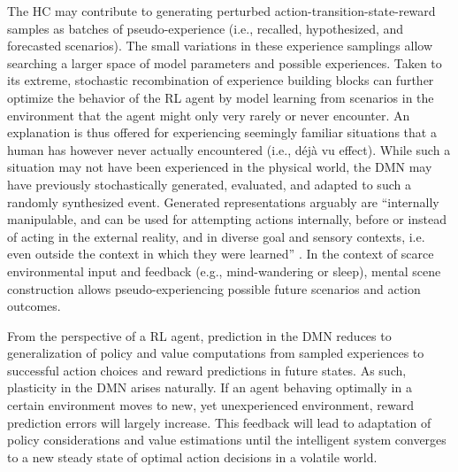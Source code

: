 \documentclass[10pt,letterpaper]{article}
\begin{document}
The HC may contribute to generating
perturbed action-transition-state-reward samples
as batches of pseudo-experience
(i.e., recalled, hypothesized, and forecasted scenarios).
The small variations in these experience samplings allow searching
a larger space of model parameters and possible experiences.
Taken to its extreme, stochastic recombination of experience
building blocks can further optimize the behavior of the RL agent
by model learning from scenarios in the environment that the agent might
only very rarely or never encounter.
An explanation is thus offered for experiencing seemingly familiar situations that
a human has however never actually encountered (i.e., d\'{e}j\`{a} vu effect).
While such a situation may not have been experienced in the physical world,
the DMN may have previously stochastically generated, evaluated, and adapted to
such a randomly synthesized event.
Generated representations arguably are ``internally manipulable,
and can be used for attempting actions internally,
before or instead of acting in the external reality,
and in diverse goal and sensory contexts, i.e. even outside the context in which they were learned''
\citep{pezzulo2011grounding}.
In the context of scarce environmental input and feedback
(e.g., mind-wandering or sleep),
mental scene construction allows pseudo-experiencing possible
future scenarios and action outcomes.



From the perspective of a RL agent,
prediction in the DMN reduces to
generalization of
policy and value computations from sampled experiences to
successful action choices and reward predictions in future states.
As such,
plasticity in the DMN arises naturally.
If an agent behaving optimally in a certain environment moves
to new, yet unexperienced environment, reward prediction errors will
largely increase.
This feedback will lead to adaptation of policy considerations
and value estimations until the intelligent system converges to a
new steady state of optimal action decisions in a volatile world.



\end{document}
